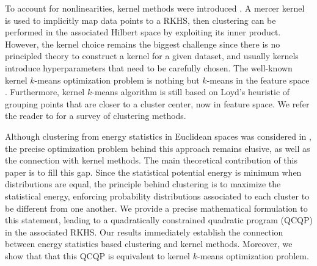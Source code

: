 \documentclass[twoside]{article}
\begin{document}
To account for nonlinearities, kernel methods were introduced 
\citep{Smola,Girolami}. A mercer kernel \citep{Mercer} is used to implicitly
map data points to a RKHS, then clustering can be performed in the associated
Hilbert space by exploiting its inner product. However, the kernel choice remains 
the biggest challenge since there is no principled theory to construct a kernel
for a given dataset, and usually kernels introduce hyperparameters that 
need to be carefully chosen.
The well-known kernel $k$-means optimization problem is nothing but $k$-means 
in the feature space \citep{Girolami}. Furthermore, kernel $k$-means algorithm
\citep{Dhillon2,Dhillon} is still based on Loyd's heuristic \citep{Lloyd}
of grouping points that are closer to a cluster center, now
in feature space. 
We refer the reader to \citep{Filippone} for a survey of clustering
methods.

Although clustering from energy statistics in Euclidean spaces was considered
in \citep{Kgroups}, the precise optimization problem behind this approach
remains elusive, as well as the connection with kernel methods.
The main theoretical contribution of this paper is to fill this gap.
Since the statistical potential energy is minimum when
distributions are equal, the principle behind clustering is to maximize 
the statistical energy,  enforcing probability distributions associated to 
each cluster to be different from one another. We provide a precise 
mathematical formulation to this statement, leading to a quadratically 
constrained quadratic program (QCQP) in the associated RKHS. Our results
immediately establish the connection between energy statistics based
clustering and kernel methods. Moreover, we show that that this 
QCQP is equivalent to kernel $k$-means optimization problem. 
\end{document}
